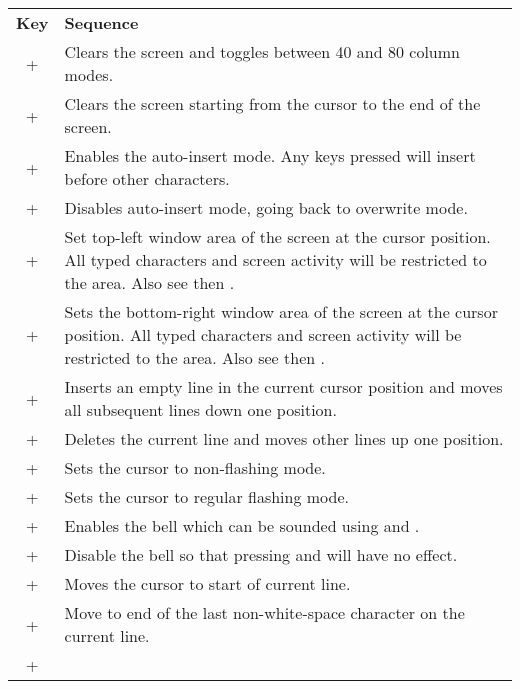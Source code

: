 \begin{center}
\begin{longtable}{c|L{5.5cm}}
	\textbf{Key} & \textbf{Sequence}\\
  \hhline{==}
	\endhead

 +  &
Clears the screen and toggles between 40 and 80 column modes.\\
\hline
{} +  &
Clears the screen starting from the cursor to the end of the screen.\\
\hline
{} +  &
Enables the auto-insert mode. Any keys pressed will insert before other characters.\\
\hline
{} +  &
Disables auto-insert mode, going back to overwrite mode.\\
\hline
{} +  &
Set top-left window area of the screen at the cursor position. All typed characters and screen activity will be restricted to the area. Also see  then .\\
\hline
{} +  &
Sets the bottom-right window area of the screen at the cursor position. All typed characters and screen activity will be restricted to the area. Also see  then .\\
\hline
{} +  &
Inserts an empty line in the current cursor position and moves all subsequent lines down one position.\\
\hline
{} +  &
Deletes the current line and moves other lines up one position.\\
\hline
{} +  &
Sets the cursor to non-flashing mode.\\
\hline
{} +  &
Sets the cursor to regular flashing mode.\\
\hline
{} +  &
Enables the bell which can be sounded using  and .\\
\hline
{} +  &
Disable the bell so that pressing  and  will have no effect.\\
\hline
{} +  &
Moves the cursor to start of current line.\\
\hline
{} +  &
Move to end of the last non-white-space character on the current line.\\
\hline
{} +  &

\end{longtable}
\end{center}
